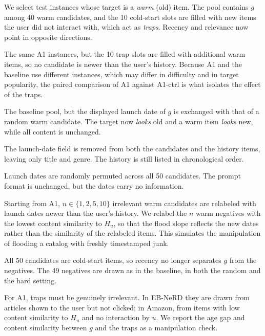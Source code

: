 \documentclass[11pt]{article}
\begin{document}
\begin{description}[leftmargin=1.2em]
  \item[A1 Old-gold (inverted pool).] We select test instances whose target is a \emph{warm} (old) item. The pool contains $g$ among 40 warm candidates, and the 10 cold-start slots are filled with new items the user did not interact with, which act as \emph{traps}. Recency and relevance now point in opposite directions.
  \item[A1-ctrl Old-gold control.] The same A1 instances, but the 10 trap slots are filled with additional warm items, so no candidate is newer than the user's history. Because A1 and the baseline use different instances, which may differ in difficulty and in target popularity, the paired comparison of A1 against A1-ctrl is what isolates the effect of the traps.
  \item[A2 Date swap.] The baseline pool, but the displayed launch date of $g$ is exchanged with that of a random warm candidate. The target now \emph{looks} old and a warm item \emph{looks} new, while all content is unchanged.
  \item[A3 Date hide.] The launch-date field is removed from both the candidates and the history items, leaving only title and genre. The history is still listed in chronological order.
  \item[A4 Date shuffle.] Launch dates are randomly permuted across all 50 candidates. The prompt format is unchanged, but the dates carry no information.
  \item[A5 Fresh flood.] Starting from A1, $n \in \{1, 2, 5, 10\}$ irrelevant warm candidates are relabeled with launch dates newer than the user's history. We relabel the $n$ warm negatives with the lowest content similarity to $H_u$, so that the flood slope reflects the new dates rather than the similarity of the relabeled items. This simulates the manipulation of flooding a catalog with freshly timestamped junk.
  \item[A6 All-cold (neutral).] All 50 candidates are cold-start items, so recency no longer separates $g$ from the negatives. The 49 negatives are drawn as in the baseline, in both the random and the hard setting.
\end{description}

For A1, traps must be genuinely irrelevant. In EB-NeRD they are drawn from articles shown to the user but not clicked; in Amazon, from items with low content similarity to $H_u$ and no interaction by $u$. We report the age gap and content similarity between $g$ and the traps as a manipulation check.
\end{document}
